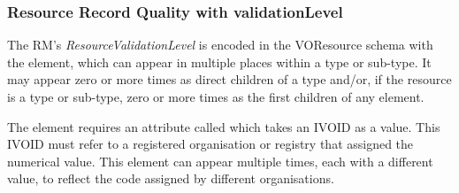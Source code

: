 \documentclass[11pt,a4paper]{ivoa}
\begin{document}


\subsubsection{Resource Record Quality with validationLevel}



The RM's \emph{ResourceValidationLevel} is encoded in the VOResource
schema with the  element, which can appear in
multiple places within a  type or sub-type.  It may
appear zero or more times as direct children of a 
type and/or, if the resource is a  type or sub-type,
zero or more times as the first children of any 
element.  

The  element requires an attribute called
 which takes an IVOID as a value.  This IVOID
must refer to a registered organisation or registry that assigned the
numerical value.  This element can appear multiple times, each with
a different  value, to reflect the code
assigned by different organisations. 
\end{document}
